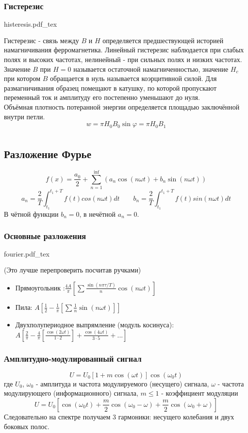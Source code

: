 \documentclass{article}
\newcommand{\incfig}[2][1]{%
    \def\svgwidth{#1\columnwidth}
    {#2.pdf_tex}
}
\begin{document}
\subsubsection{Гистерезис}
\incfig{histeresis}
Гистерезис - связь между $B$ и $H$ определяется предшествующей историей намагничивания ферромагнетика.
Линейный гистерезис наблюдается при слабых полях и высоких частотах, нелинейный - при сильных полях и низких частотах.
Значение $B$ при $H=0$ называется остаточной намагниченностью, значение $H_c$ при котором $B$ обращается в нуль называется коэрцитивной силой.
Для размагничивания образец помещают в катушку, по которой пропускают переменный ток и амплитуду его постепенно уменьшают до нуля.\\
Объёмная плотность потеранной энергии определяется площадью заключённой внутри петли.
\[w=\pi H_0B_0 \sin \varphi=\pi H_0B_1\]

\section{}
\subsection{Разложение Фурье}
\[f(x)=\frac{a_0}{2} + \sum_{n=1}^{\inf}(a_n \cos (n \omega t) + b_n \sin (n \omega t))\]
\[a_n = \frac{2}{T}\int_{t_1}^{t_1+T}f(t)cos(n\omega t)dt \qquad b_n = \frac{2}{T}\int_{t_1}^{t_1+T}f(t)sin(n\omega t)dt\]
В чётной функции $b_n=0$, в нечётной $a_n=0$.
\subsubsection{Основные разложения}
\incfig{fourier}
(Это лучше перепроверить посчитав ручками)
\begin{itemize}
    \item Прямоугольник :$\frac{4A}{\pi}[\sum\frac{\sin(n\pi\tau/T)}{n}\cos(n\omega t)]$
    \item Пила: $A[\frac{1}{2}-\frac{1}{\pi}[\sum \frac{1}{n} \sin(n\omega t)]]$
    \item Двухполупериодное выпрямление (модуль косинуса): \\ $A[\frac{2}{\pi}-\frac{4}{\pi}[\frac{\cos(2\omega t)}{1\cdot2}] + \frac{\cos(4\omega t)}{3\cdot5} + ...]$
\end{itemize}
\subsubsection{Амплитудно-модулированный сигнал}
\[U=U_0[1+m\cos(\omega t)]\cos(\omega_0 t)\]
где $U_0$, $\omega_0$ - амплитуда и частота модулируемого (несущего) сигнала, $\omega$ - частота модулирующего (информационного) сигнала, $m\le1$ - коэффициент модуляции 
\[U=U_0[\cos(\omega_0 t) + \frac{m}{2}\cos(\omega_0 - \omega) + \frac{m}{2}\cos(\omega_0 + \omega)]\]
Следовательно на спектре получаем 3 гармоники: несущего колебания и двух боковых полос.
\end{document}
